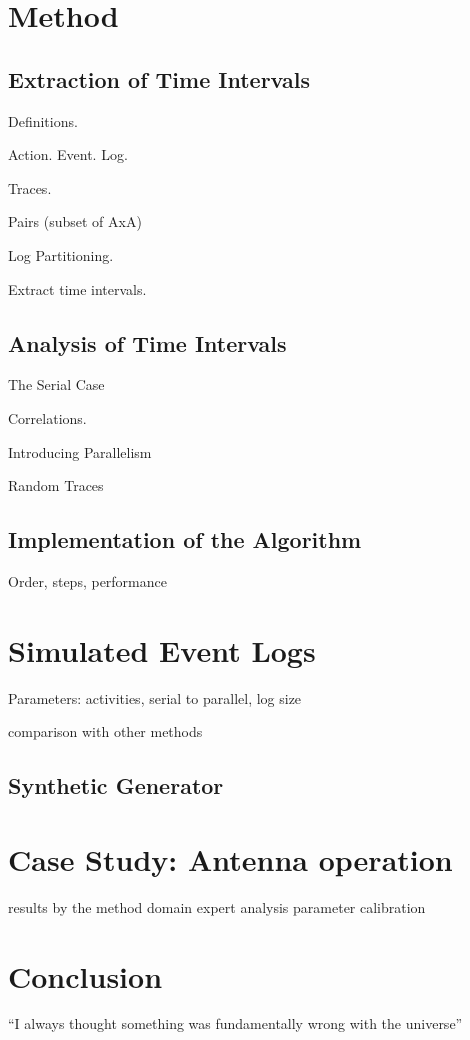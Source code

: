 \documentclass{article}
\begin{document}
\section{Method}

\subsection{Extraction of Time Intervals}

Definitions.

Action. Event. Log. 

Traces. 

Pairs (subset of AxA)

Log Partitioning.

Extract time intervals.

\subsection{Analysis of Time Intervals}

The Serial Case

Correlations. 

Introducing Parallelism

Random Traces

\subsection{Implementation of the Algorithm}

Order, steps, performance


\section{Simulated Event Logs}

Parameters: activities, serial to parallel, log size

comparison with other methods

\subsection{Synthetic Generator}



\section{Case Study: Antenna operation}

results by the method
domain expert analysis
parameter calibration

\section{Conclusion}

``I always thought something was fundamentally wrong with the universe'' \citep{adams1995hitchhiker}




\end{document}
